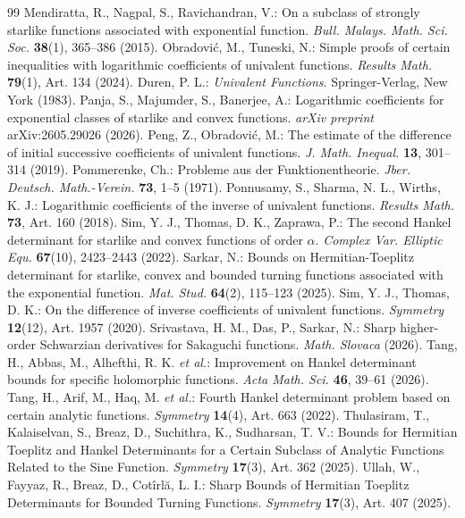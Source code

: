 \documentclass[10pt,a4paper]{amsart}
\numberwithin{equation}{section}
\begin{document}
\begin{thebibliography}{99}
 Mendiratta, R., Nagpal, S., Ravichandran, V.: On a subclass of strongly starlike functions associated with exponential function. \textit{Bull. Malays. Math. Sci. Soc.} \textbf{38}(1), 365--386 (2015).
 Obradovi\'c, M., Tuneski, N.: Simple proofs of certain inequalities with logarithmic coefficients of univalent functions. \textit{Results Math.} \textbf{79}(1), Art. 134 (2024).
 Duren, P. L.: \textit{Univalent Functions}. Springer-Verlag, New York (1983).
 Panja, S., Majumder, S., Banerjee, A.: Logarithmic coefficients for exponential classes of starlike and convex functions. \textit{arXiv preprint} arXiv:2605.29026 (2026).
 Peng, Z., Obradovi\'c, M.: The estimate of the difference of initial successive coefficients of univalent functions. \textit{J. Math. Inequal.} \textbf{13}, 301--314 (2019).
 Pommerenke, Ch.: Probleme aus der Funktionentheorie. \textit{Jber. Deutsch. Math.-Verein.} \textbf{73}, 1--5 (1971).
 Ponnusamy, S., Sharma, N. L., Wirths, K. J.: Logarithmic coefficients of the inverse of univalent functions. \textit{Results Math.} \textbf{73}, Art. 160 (2018).
 Sim, Y. J., Thomas, D. K., Zaprawa, P.: The second Hankel determinant for starlike and convex functions of order $\alpha$. \textit{Complex Var. Elliptic Equ.} \textbf{67}(10), 2423--2443 (2022).
 Sarkar, N.: Bounds on Hermitian-Toeplitz determinant for starlike, convex and bounded turning functions associated with the exponential function. \textit{Mat. Stud.} \textbf{64}(2), 115--123 (2025).
 Sim, Y. J., Thomas, D. K.: On the difference of inverse coefficients of univalent functions. \textit{Symmetry} \textbf{12}(12), Art. 1957 (2020).
 Srivastava, H. M., Das, P., Sarkar, N.: Sharp higher-order Schwarzian derivatives for Sakaguchi functions. \textit{Math. Slovaca} (2026). %
 Tang, H., Abbas, M., Alhefthi, R. K. \textit{et al.}: Improvement on Hankel determinant bounds for specific holomorphic functions. \textit{Acta Math. Sci.} \textbf{46}, 39--61 (2026).
 Tang, H., Arif, M., Haq, M. \textit{et al.}: Fourth Hankel determinant problem based on certain analytic functions. \textit{Symmetry} \textbf{14}(4), Art. 663 (2022).
 Thulasiram, T., Kalaiselvan, S., Breaz, D., Suchithra, K., Sudharsan, T. V.: Bounds for Hermitian Toeplitz and Hankel Determinants for a Certain Subclass of Analytic Functions Related to the Sine Function. \textit{Symmetry} \textbf{17}(3), Art. 362 (2025).
 Ullah, W., Fayyaz, R., Breaz, D., Cot\^{i}rl\u{a}, L. I.: Sharp Bounds of Hermitian Toeplitz Determinants for Bounded Turning Functions. \textit{Symmetry} \textbf{17}(3), Art. 407 (2025).
\end{thebibliography}
\end{document}
